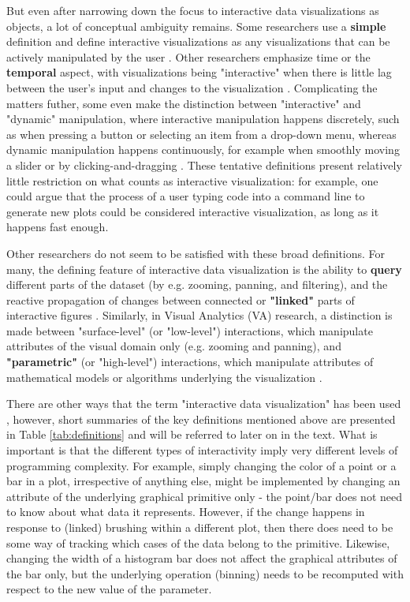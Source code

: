 \documentclass[12pt,a4paper]{article}
\begin{document}
But even after narrowing down the focus to interactive data visualizations as objects, a lot of conceptual ambiguity remains. Some researchers use a \textbf{simple} definition and define interactive visualizations as any visualizations that can be actively manipulated by the user \citep{brodbeck2009}. Other researchers emphasize time or the \textbf{temporal} aspect, with visualizations being "interactive" when there is little lag between the user's input and changes to the visualization \citep{becker1987,buja1996}. Complicating the matters futher, some even make the distinction between "interactive" and "dynamic" manipulation, where interactive manipulation happens discretely, such as when pressing a button or selecting an item from a drop-down menu, whereas dynamic manipulation happens continuously, for example when smoothly moving a slider or by clicking-and-dragging \citep{rheingans2002,jankun2007model}. These tentative definitions present relatively little restriction on what counts as interactive visualization: for example, one could argue that the process of a user typing code into a command line to generate new plots could be considered interactive visualization, as long as it happens fast enough. 

Other researchers do not seem to be satisfied with these broad definitions. For many, the defining feature of interactive data visualization is the ability to \textbf{query} different parts of the dataset (by e.g. zooming, panning, and filtering), and the reactive propagation of changes between connected or \textbf{"linked"} parts of interactive figures \citep{kehrer2012,buja1996,keim2002,unwin1999}. Similarly, in Visual Analytics (VA) research, a distinction is made between "surface-level" (or "low-level") interactions, which manipulate attributes of the visual domain only (e.g. zooming and panning), and \textbf{"parametric"} (or "high-level") interactions, which manipulate attributes of mathematical models or algorithms underlying the visualization \citep{leman2013,pike2009}. 

There are other ways that the term "interactive data visualization" has been used \citep[for more detailed taxonomies, see][]{yi2007}, however, short summaries of the key definitions mentioned above are presented in Table \ref{tab:definitions} and will be referred to later on in the text. What is important is that the different types of interactivity imply very different levels of programming complexity. For example, simply changing the color of a point or a bar in a plot, irrespective of anything else, might be implemented by changing an attribute of the underlying graphical primitive only - the point/bar does not need to know about what data it represents. However, if the change happens in response to (linked) brushing within a different plot, then there does need to be some way of tracking which cases of the data belong to the primitive. Likewise, changing the width of a histogram bar does not affect the graphical attributes of the bar only, but the underlying operation (binning) needs to be recomputed with respect to the new value of the parameter.  
\end{document}
